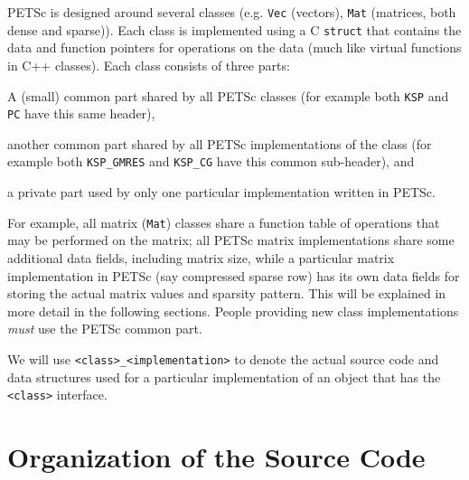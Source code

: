 PETSc is designed around several classes (e.g. \lstinline{Vec} (vectors),
\lstinline{Mat} (matrices, both dense and sparse)). Each class is 
implemented using a C \lstinline{struct} that contains the data and function pointers
for operations on the data (much like virtual functions in C++ classes).
Each class consists of three parts:
\begin{tightenumerate}
  \item A (small) common part shared by all PETSc classes (for example both \lstinline{KSP} and \lstinline{PC} have this same header),
  \item another common part shared by all PETSc implementations of the class (for example both \lstinline{KSP_GMRES} and \lstinline{KSP_CG} have this common sub-header), and
  \item a private part used by only one particular implementation written in PETSc.
\end{tightenumerate}
For example, all matrix (\lstinline{Mat}) classes share a function table of operations that
may be performed on the matrix; all PETSc matrix implementations share some additional
data fields, including matrix size, while a particular matrix implementation in PETSc
(say compressed sparse row) has its own data fields for storing the actual
matrix values and sparsity pattern. This will be explained in more detail
in the following sections. People providing new class implementations {\em must}
use the PETSc common part.


We will use \lstinline{<class>_<implementation>} to denote the actual source code and
data structures used for a particular implementation of an object that has the
\lstinline{<class>} interface.

\section{Organization of the Source Code}

